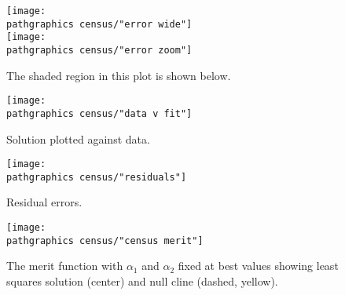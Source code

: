     \begin{figure}[t]
    	\texttt{[image: \\pathgraphics census/"error wide"]} \\[20pt]
    	\texttt{[image: \\pathgraphics census/"error zoom"]}
    	\caption{The shaded region in this plot is shown below.}
    \end{figure}
    \begin{figure}[t]
    	\texttt{[image: \\pathgraphics census/"data v fit"]}
    	\caption{Solution plotted against data.}
    \end{figure}
    \begin{figure}[t]
    	\texttt{[image: \\pathgraphics census/"residuals"]}
    	\caption{Residual errors.}
    \end{figure}
    \begin{figure}[t]
      \texttt{[image: \\pathgraphics census/"census merit"]}
      \caption[The merit function showing least squares solution]{The merit function with $\alpha_{1}$ and $\alpha_{2}$ fixed at best values showing least squares solution (center) and null cline (dashed, yellow).}
    \end{figure}


